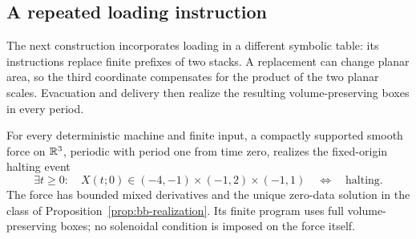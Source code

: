 \subsection{A repeated loading instruction}

The next construction incorporates loading in a different symbolic table:
its instructions replace finite prefixes of two stacks. A replacement can
change planar area, so the third coordinate compensates for the product
of the two planar scales. Evacuation and delivery then realize the
resulting volume-preserving boxes in every period.

\begin{theorem}\label{thm:bb-prefix29}
For every deterministic machine and finite input, a compactly supported
smooth force on $\mathbb R^3$, periodic with period one from time zero,
realizes the fixed-origin halting event
\[
 \exists t\ge0:\quad X(t;0)\in(-4,-1)\times(-1,2)\times(-1,1)
 \quad\Longleftrightarrow\quad\text{halting}.
\]
The force has bounded mixed derivatives and the unique zero-data
solution in the class of Proposition~\ref{prop:bb-realization}.
Its finite program uses full volume-preserving boxes; no solenoidal
condition is imposed on the force itself.
\end{theorem}
